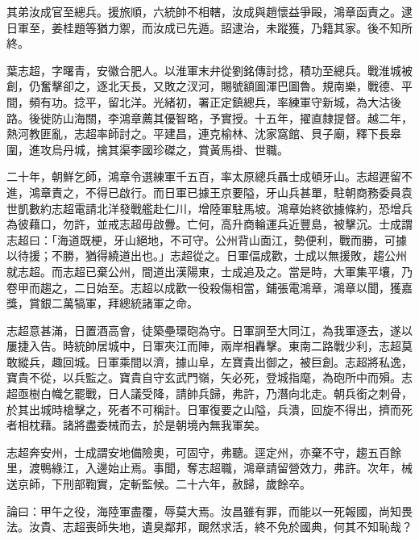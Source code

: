 \begin{pinyinscope}
其弟汝成官至總兵。援旅順，六統帥不相轄，汝成與趙懷益爭毆，鴻章函責之。逮日軍至，姜桂題等猶力禦，而汝成已先遁。詔逮治，未蹤獲，乃籍其家。後不知所終。

葉志超，字曙青，安徽合肥人。以淮軍末弁從劉銘傳討捻，積功至總兵。戰淮城被創，仍奮擊卻之，逐北天長，又敗之汊河，賜號額圖渾巴圖魯。規南樂，戰德、平間，頻有功。捻平，留北洋。光緒初，署正定鎮總兵，率練軍守新城，為大沽後路。後徙防山海關，李鴻章薦其優智略，予實授。十五年，擢直隸提督。越二年，熱河教匪亂，志超率師討之。平建昌，連克榆林、沈家窩館、貝子廟，釋下長皋圍，進攻烏丹城，擒其渠李國珍磔之，賞黃馬褂、世職。

二十年，朝鮮乞師，鴻章令選練軍千五百，率太原總兵聶士成頓牙山。志超遲留不進，鴻章責之，不得已啟行。而日軍已據王京要隘，牙山兵甚單，駐朝商務委員袁世凱數約志超電請北洋發戰艦赴仁川，增陸軍駐馬坡。鴻章始終欲據條約，恐增兵為彼藉口，勿許，並戒志超毋啟釁。亡何，高升商輪運兵近豐島，被擊沉。士成謂志超曰：「海道既梗，牙山絕地，不可守。公州背山面江，勢便利，戰而勝，可據以待援；不勝，猶得繞道出也。」志超從之。日軍偪成歡，士成以無援敗，趨公州就志超。而志超已棄公州，間道出漢陽東，士成追及之。當是時，大軍集平壤，乃卷甲而趨之，二日始至。志超以成歡一役殺傷相當，鋪張電鴻章，鴻章以聞，獲嘉獎，賞銀二萬犒軍，拜總統諸軍之命。

志超意甚滿，日置酒高會，徒築壘環砲為守。日軍詗至大同江，為我軍逐去，遂以屢捷入告。時統帥居城中，日軍夾江而陣，兩岸相轟擊。東南二路戰少利，志超莫敢縱兵，趣回城。日軍乘間以濟，據山阜，左寶貴出御之，被巨創。志超將私逸，寶貴不從，以兵監之。寶貴自守玄武門嶺，矢必死，登城指麾，為砲所中而殞。志超亟樹白幟乞罷戰，日人議受降，請帥兵歸，弗許，乃潛向北走。朝兵銜之刺骨，於其出城時槍擊之，死者不可稱計。日軍復要之山隘，兵潰，回旋不得出，擠而死者相枕藉。諸將盡委械而去，於是朝境內無我軍矣。

志超奔安州，士成謂安地備險奧，可固守，弗聽。逕定州，亦棄不守，趨五百餘里，渡鴨綠江，入邊始止焉。事聞，奪志超職，鴻章請留營效力，弗許。次年，械送京師，下刑部鞫實，定斬監候。二十六年，赦歸，歲餘卒。

論曰：甲午之役，海陸軍盡覆，辱莫大焉。汝昌雖有罪，而能以一死報國，尚知畏法。汝貴、志超喪師失地，遺臭鄰邦，靦然求活，終不免於國典，何其不知恥哉？


\end{pinyinscope}